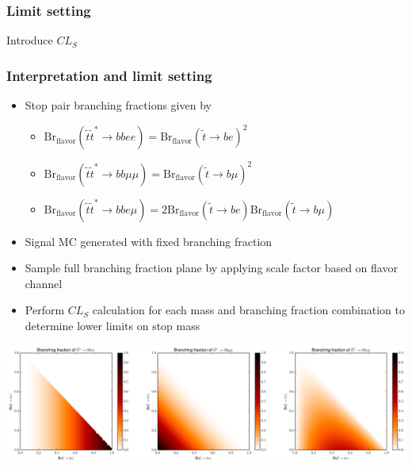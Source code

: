 \documentclass[10pt, svgnames]{beamer}
\begin{document}
\begin{frame}
  \frametitle{Limit setting}
  \UpdateFlag
  Introduce $CL_{S}$
\end{frame}

\begin{frame}
  \frametitle{Interpretation and limit setting}
  \begin{itemize}
    \item Stop pair branching fractions given by
      \begin{itemize}
        \item $\mathrm{Br}_\mathrm{flavor}
          (\tilde{t}\tilde{t}^{*} \rightarrow bbee)
          =
          \mathrm{Br}_\mathrm{flavor}(\tilde{t} \rightarrow be )^{2}$
        \item $\mathrm{Br}_\mathrm{flavor}
          (\tilde{t}\tilde{t}^{*} \rightarrow bb\mu\mu)
          =
          \mathrm{Br}_\mathrm{flavor}(\tilde{t} \rightarrow b\mu )^{2}$
        \item $\mathrm{Br}_\mathrm{flavor}
          (\tilde{t}\tilde{t}^{*} \rightarrow bbe\mu)
          =
          2
          \mathrm{Br}_\mathrm{flavor}(\tilde{t} \rightarrow be )
          \mathrm{Br}_\mathrm{flavor}(\tilde{t} \rightarrow b\mu )$
      \end{itemize}
    \item Signal MC generated with fixed branching fraction
    \item Sample full branching fraction plane by applying scale factor based
      on flavor channel
    \item Perform $CL_{S}$ calculation for each mass and branching fraction
      combination to determine lower limits on stop mass
  \end{itemize}
  \begin{center}
  \includegraphics[width=\linewidth]{figures/blstop/branching_fractions.png}
  \end{center}
\end{frame}
\end{document}
